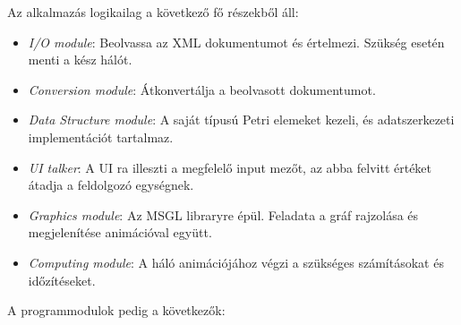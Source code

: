 Az alkalmazás logikailag a következő fő részekből áll:
\begin{itemize}
\item \textit{I/O module}: Beolvassa az XML dokumentumot és értelmezi. Szükség esetén menti a kész hálót.
\item \textit{Conversion module}: Átkonvertálja  a beolvasott dokumentumot.
\item \textit{Data Structure module}: A saját típusú Petri elemeket kezeli, és adatszerkezeti implementációt tartalmaz. 
\item \textit{UI talker}: A UI ra illeszti a megfelelő input mezőt, az abba felvitt értéket átadja a feldolgozó egységnek.
\item \textit{Graphics module}: Az MSGL libraryre épül. Feladata a gráf rajzolása és megjelenítése animációval együtt. 
\item \textit{Computing module}: A háló animációjához végzi a szükséges számításokat és időzítéseket. 
\end{itemize}
A programmodulok pedig a következők:
